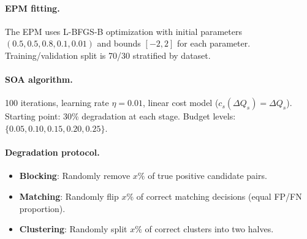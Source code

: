 \documentclass{article}
\begin{document}
\paragraph{EPM fitting.}
The EPM uses L-BFGS-B optimization with initial parameters $(0.5, 0.5, 0.8, 0.1, 0.01)$ and bounds $[-2, 2]$ for each parameter. Training/validation split is 70/30 stratified by dataset.

\paragraph{SOA algorithm.}
100 iterations, learning rate $\eta = 0.01$, linear cost model ($c_s(\Delta Q_s) = \Delta Q_s$). Starting point: 30\% degradation at each stage. Budget levels: $\{0.05, 0.10, 0.15, 0.20, 0.25\}$.

\paragraph{Degradation protocol.}
\begin{itemize}
    \item \textbf{Blocking}: Randomly remove $x\%$ of true positive candidate pairs.
    \item \textbf{Matching}: Randomly flip $x\%$ of correct matching decisions (equal FP/FN proportion).
    \item \textbf{Clustering}: Randomly split $x\%$ of correct clusters into two halves.
\end{itemize}
\end{document}
